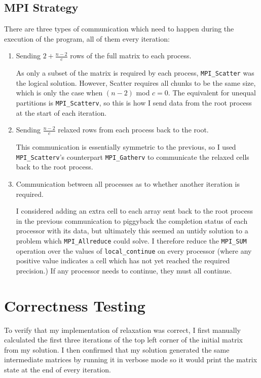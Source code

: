 \documentclass[12pt]{article}
\begin{document}
\subsection{MPI Strategy}

There are three types of communication which need to happen during the execution of the program, all of them every iteration:
\begin{enumerate}
	\item Sending $2+\frac{n-2}{c}$ rows of the full matrix to each process.\par
			As only a subset of the matrix is required by each process, \texttt{MPI\_Scatter} was the logical solution. However, Scatter requires all chunks to be the same size, which is only the case when $(n-2)$ mod $c=0$. The equivalent for unequal partitions is \texttt{MPI\_Scatterv}, so this is how I send data from the root process at the start of each iteration.
	
	\item Sending $\frac{n-2}{c}$ relaxed rows from each process back to the root. \par
			This communication is essentially symmetric to the previous, so I used \texttt{MPI\_Scatterv}'s counterpart \texttt{MPI\_Gatherv} to communicate the relaxed cells back to the root process.
			
	\item Communication between all processes as to whether another iteration is required.\par
			I considered adding an extra cell to each array sent back to the root process in the previous communication to piggyback the completion status of each processor with its data, but ultimately this seemed an untidy solution to a problem which \texttt{MPI\_Allreduce} could solve. I therefore reduce the \texttt{MPI\_SUM} operation over the values of \texttt{local\_continue} on every processor (where any positive value indicates a cell which has not yet reached the required precision.) If any processor needs to continue, they must all continue.
\end{enumerate}


\section{Correctness Testing}

To verify that my implementation of relaxation was correct, I first manually calculated the first three iterations of the top left corner of the initial matrix from my solution. I then confirmed that my solution generated the same intermediate matrices by running it in verbose mode so it would print the matrix state at the end of every iteration.
\end{document}
